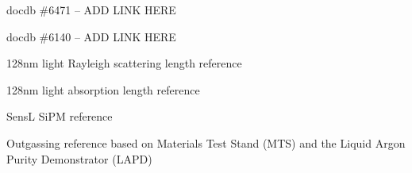 \begin{thebibliography}{99}
 docdb \#6471 -- ADD LINK HERE

 docdb \#6140  -- ADD LINK HERE

 128nm light Rayleigh scattering length reference

 128nm light absorption length reference


 SensL SiPM reference

 Outgassing reference based on Materials Test Stand (MTS) and the Liquid Argon Purity Demonstrator (LAPD)


\end{thebibliography}
